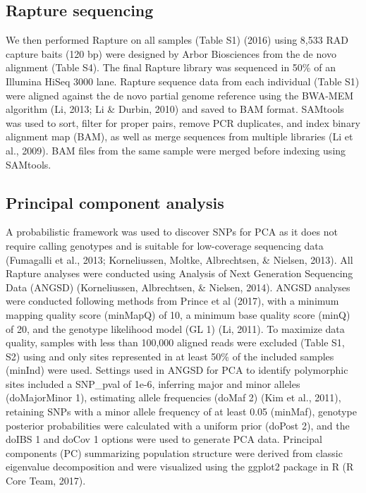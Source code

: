 \documentclass[twoside,12pt,final]{ucthesis-CA2012}
\begin{document}
\begin{ucmainmatter}
\hypertarget{rapture-sequencing}{%
\subsection{Rapture sequencing}\label{rapture-sequencing}}

We then performed Rapture on all samples (Table S1) (2016) using 8,533
RAD capture baits (120 bp) were designed by Arbor Biosciences from the
de novo alignment (Table S4). The final Rapture library was sequenced in
50\% of an Illumina HiSeq 3000 lane. Rapture sequence data from each
individual (Table S1) were aligned against the de novo partial genome
reference using the BWA-MEM algorithm (Li, 2013; Li \& Durbin, 2010) and
saved to BAM format. SAMtools was used to sort, filter for proper pairs,
remove PCR duplicates, and index binary alignment map (BAM), as well as
merge sequences from multiple libraries (Li et al., 2009). BAM files
from the same sample were merged before indexing using SAMtools.

\hypertarget{principal-component-analysis}{%
\subsection{Principal component
analysis}\label{principal-component-analysis}}

A probabilistic framework was used to discover SNPs for PCA as it does
not require calling genotypes and is suitable for low-coverage
sequencing data (Fumagalli et al., 2013; Korneliussen, Moltke,
Albrechtsen, \& Nielsen, 2013). All Rapture analyses were conducted
using Analysis of Next Generation Sequencing Data (ANGSD) (Korneliussen,
Albrechtsen, \& Nielsen, 2014). ANGSD analyses were conducted following
methods from Prince et al (2017), with a minimum mapping quality score
(minMapQ) of 10, a minimum base quality score (minQ) of 20, and the
genotype likelihood model (GL 1) (Li, 2011). To maximize data quality,
samples with less than 100,000 aligned reads were excluded (Table S1,
S2) using and only sites represented in at least 50\% of the included
samples (minInd) were used. Settings used in ANGSD for PCA to identify
polymorphic sites included a SNP\_pval of 1e-6, inferring major and
minor alleles (doMajorMinor 1), estimating allele frequencies (doMaf 2)
(Kim et al., 2011), retaining SNPs with a minor allele frequency of at
least 0.05 (minMaf), genotype posterior probabilities were calculated
with a uniform prior (doPost 2), and the doIBS 1 and doCov 1 options
were used to generate PCA data. Principal components (PC) summarizing
population structure were derived from classic eigenvalue decomposition
and were visualized using the ggplot2 package in R (R Core Team, 2017).


\end{ucmainmatter}
\end{document}
